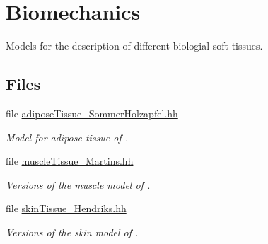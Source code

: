 \hypertarget{group__Biomechanics}{\section{Biomechanics}
\label{group__Biomechanics}
}


Models for the description of different biologial soft tissues.  


\subsection*{Files}
\begin{DoxyCompactItemize}
\item 
file \hyperlink{adiposeTissue__SommerHolzapfel_8hh}{adipose\-Tissue\-\_\-\-Sommer\-Holzapfel.\-hh}
\begin{DoxyCompactList}\small\item\em Model for adipose tissue of \cite{Sommer2013}. \end{DoxyCompactList}\item 
file \hyperlink{muscleTissue__Martins_8hh}{muscle\-Tissue\-\_\-\-Martins.\-hh}
\begin{DoxyCompactList}\small\item\em Versions of the muscle model of \cite{Martins1998}. \end{DoxyCompactList}\item 
file \hyperlink{skinTissue__Hendriks_8hh}{skin\-Tissue\-\_\-\-Hendriks.\-hh}
\begin{DoxyCompactList}\small\item\em Versions of the skin model of \cite{Hendriks2005}. \end{DoxyCompactList}\end{DoxyCompactItemize}
